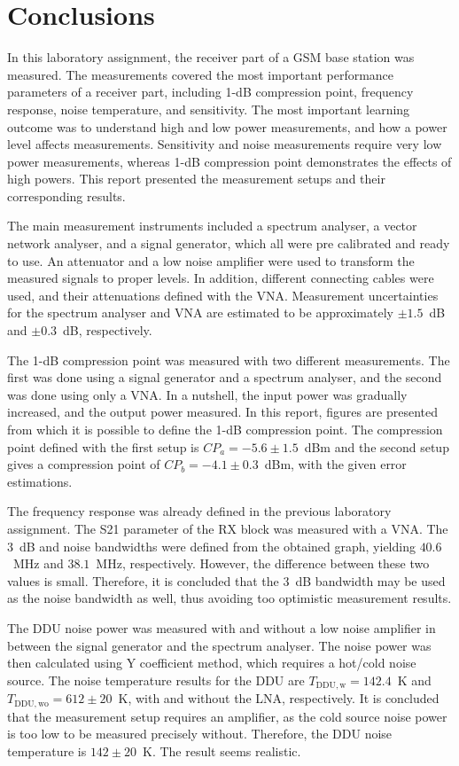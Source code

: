 \documentclass[a4paper, 12pt]{article}
\begin{document}
\section{Conclusions}

In this laboratory assignment, the receiver part of a GSM base station was measured. The measurements covered the most important performance parameters of a receiver part, including 1-dB compression point, frequency response, noise temperature, and sensitivity. The most important learning outcome was to understand high and low power measurements, and how a power level affects measurements. Sensitivity and noise measurements require very low power measurements, whereas 1-dB compression point demonstrates the effects of high powers. This report presented the measurement setups and their corresponding results.

The main measurement instruments included a spectrum analyser, a vector network analyser, and a signal generator, which all were pre calibrated and ready to use. An attenuator and a low noise amplifier were used to transform the measured signals to proper levels. In addition, different connecting cables were used, and their attenuations defined with the VNA. Measurement uncertainties for the spectrum analyser and VNA are estimated to be approximately $\pm1.5$~dB and $\pm0.3$~dB, respectively.

The 1-dB compression point was measured with two different measurements. The first was done using a signal generator and a spectrum analyser, and the second was done using only a VNA. In a nutshell, the input power was gradually increased, and the output power measured. In this report, figures are presented from which it is possible to define the 1-dB compression point. The compression point defined with the first setup is $CP_a = -5.6 \pm 1.5$~dBm and the second setup gives a compression point of $CP_b = -4.1 \pm 0.3$~dBm, with the given error estimations.

The frequency response was already defined in the previous laboratory assignment. The S21 parameter of the RX block was measured with a VNA. The $3$~dB and noise bandwidths were defined from the obtained graph, yielding $40.6$~MHz and $38.1$~MHz, respectively. However, the difference between these two values is small. Therefore, it is concluded that the $3$~dB bandwidth may be used as the noise bandwidth as well, thus avoiding too optimistic measurement results.

The DDU noise power was measured with and without a low noise amplifier in between the signal generator and the spectrum analyser. The noise power was then calculated using Y coefficient method, which requires a hot/cold noise source. The noise temperature results for the DDU are $T_\mathrm{DDU, w} = 142.4$~K and $T_\mathrm{DDU, wo} = 612 \pm 20$~K, with and without the LNA, respectively. It is concluded that the measurement setup requires an amplifier, as the cold source noise power is too low to be measured precisely without. Therefore, the DDU noise temperature is $142 \pm 20$~K. The result seems realistic.
\end{document}
